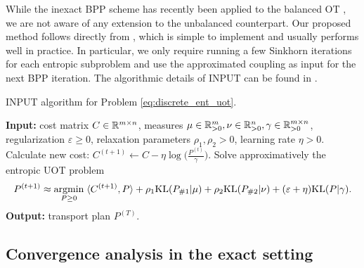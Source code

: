 While the inexact BPP scheme has recently been applied to the balanced OT \citep{Xie20,Yang22},
we are not aware of any extension to the unbalanced counterpart.
Our proposed method follows directly from \citep{Xie20}, which is simple to implement and
usually performs well in practice. In particular,
we only require running a few Sinkhorn iterations for each entropic subproblem and
use the approximated coupling as input for the next BPP iteration.
The algorithmic details of INPUT can be found in .
\begin{algorithm}[t]
  \caption{INPUT algorithm for Problem \eqref{eq:discrete_ent_uot}.}
  \label{alg:isppa}
\begin{algorithmic}[1]
  \STATE \textbf{Input:} cost matrix $C \in \mathbb R^{m \times n}$,
  measures $\mu \in \mathbb R^m_{> 0}, \nu \in \mathbb R^n_{> 0}, \gamma \in \mathbb R^{m \times n}_{> 0}$,
  regularization $\varepsilon \geq 0$, relaxation parameters $\rho_1, \rho_2 > 0$,
  learning rate $\eta > 0$.
  \STATE Calculate new cost: $C^{(t+1)} \gets C - \eta \log \Big( \frac{P^{(t)}}{\gamma} \Big)$.
  \STATE Solve approximatively the entropic UOT problem
  \begin{align}
    P^{(t+1)} \approx \operatorname*{argmin}_{P \geq 0} \; \langle C^{(t+1)}, P \rangle +
    \rho_1 \text{KL}(P_{\# 1} | \mu) + \rho_2 \text{KL}(P_{\# 2} | \nu) + (\varepsilon + \eta) \text{KL}(P | \gamma).
  \end{align}
  \ENDFOR
  \STATE \textbf{Output:} transport plan $P^{(T)}$.
\end{algorithmic}
\end{algorithm}

\subsection{Convergence analysis in the exact setting}

